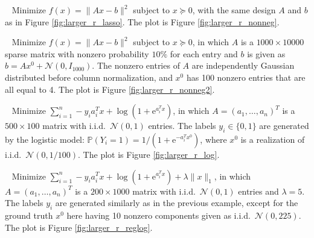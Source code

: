 \documentclass[twoside,11pt]{article}
\def\iid{\textrm{i.i.d.~}}
\begin{document}
\vspace{0.4em}
~ Minimize $f(x) = \|Ax-b\|^2$ subject to $x\succeq 0$, with the same design $A$ and $b$ as in Figure \ref{fig:larger_r_lasso}. The plot is Figure \ref{fig:larger_r_nonneg}.

\vspace{0.4em}
~ Minimize $f(x) = \|Ax-b\|^2$ subject to $x\succeq 0$, in which $A$ is a $1000\times 10000$ sparse matrix with nonzero probability $10\%$ for each entry and $b$ is given as $b = Ax^0 + \mathcal{N}(0, I_{1000})$. The nonzero entries of $A$ are independently Gaussian distributed before column normalization, and $x^0$ has 100 nonzero entries that are all equal to 4. The plot is Figure \ref{fig:larger_r_nonneg2}.

\vspace{0.4em}
~ Minimize $\sum_{i=1}^n - y_i a_i^T x + \log(1 + \mathrm{e}^{a_i^T x})$, in which $A = (a_1, \ldots, a_n)^T$ is a $500 \times 100$ matrix with \iid $\mathcal{N}(0,1)$ entries. The labels $y_i \in \{0, 1\}$ are generated by the logistic model: $\mathbb P(Y_i = 1) = 1/(1 + \mathrm{e}^{-a_i^T x^0})$, where $x^0$ is a realization of \iid $\mathcal{N}(0, 1/100)$. The plot is Figure \ref{fig:larger_r_log}.

\vspace{0.4em}
~ Minimize $\sum_{i=1}^n - y_i a_i^T x + \log(1 + \mathrm{e}^{a_i^T x}) + \lambda \|x\|_1$, in which $A = (a_1, \ldots, a_n)^T$ is a $200 \times 1000$ matrix with \iid $\mathcal{N}(0,1)$ entries and $\lambda = 5$. The labels $y_i$ are generated similarly as in the previous example, except for the ground truth $x^0$ here having 10 nonzero components given as \iid $\mathcal{N}(0, 225)$. The plot is Figure \ref{fig:larger_r_reglog}.



\end{document}

